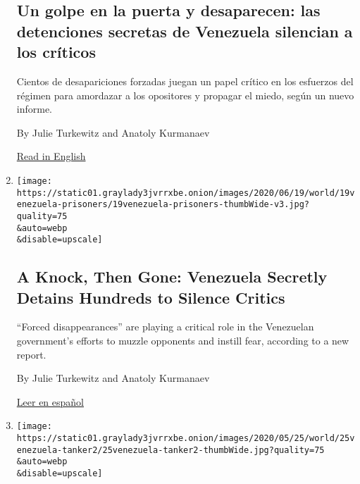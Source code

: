 \begin{enumerate}
  \hypertarget{un-golpe-en-la-puerta-y-desaparecen-las-detenciones-secretas-de-venezuela-silencian-a-los-cruxedticos}{%
  \subsection{Un golpe en la puerta y desaparecen: las detenciones
  secretas de Venezuela silencian a los
  críticos}\label{un-golpe-en-la-puerta-y-desaparecen-las-detenciones-secretas-de-venezuela-silencian-a-los-cruxedticos}}

  Cientos de desapariciones forzadas juegan un papel crítico en los
  esfuerzos del régimen para amordazar a los opositores y propagar el
  miedo, según un nuevo informe.

  By Julie Turkewitz and Anatoly Kurmanaev

  \href{https://www.nytimes3xbfgragh.onion/2020/06/19/world/americas/venezuela-forced-disappearances-Maduro.html}{Read
  in English}
\item
  \href{/2020/06/19/world/americas/venezuela-forced-disappearances-Maduro.html}{}

  \texttt{[image: https://static01.graylady3jvrrxbe.onion/images/2020/06/19/world/19venezuela-prisoners/19venezuela-prisoners-thumbWide-v3.jpg?quality=75\\\&auto=webp\\\&disable=upscale]}

  \hypertarget{a-knock-then-gone-venezuela-secretly-detains-hundreds-to-silence-critics}{%
  \subsection{A Knock, Then Gone: Venezuela Secretly Detains Hundreds to
  Silence
  Critics}\label{a-knock-then-gone-venezuela-secretly-detains-hundreds-to-silence-critics}}

  ``Forced disappearances'' are playing a critical role in the
  Venezuelan government's efforts to muzzle opponents and instill fear,
  according to a new report.

  By Julie Turkewitz and Anatoly Kurmanaev

  \href{https://www.nytimes3xbfgragh.onion/es/2020/06/19/espanol/america-latina/desapariciones-forzadas-venezuela-informe-maduro.html}{Leer
  en español}
\item
  \href{/2020/05/25/world/americas/Iranian-oil-tankers-venezuela.html}{}

  \texttt{[image: https://static01.graylady3jvrrxbe.onion/images/2020/05/25/world/25venezuela-tanker2/25venezuela-tanker2-thumbWide.jpg?quality=75\\\&auto=webp\\\&disable=upscale]}


\end{enumerate}
